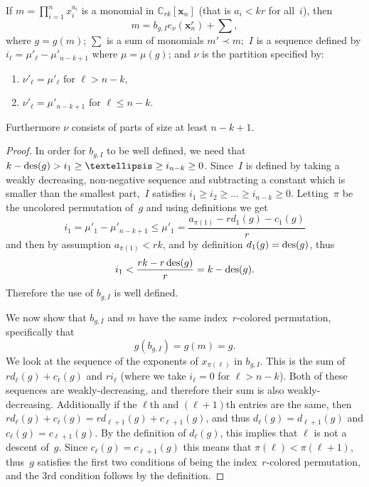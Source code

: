 \documentclass[10pt]{article}
\begin{document}
\begin{lemm}

\label{OrderLem2}
If $m=\prod_{i=1}^n x_i^{a_i}$ is a monomial in $\mathbb{C}_{rk}[\mathbf{x}_n]$ \textup{(}that is $a_i<kr$ for all~$i$\textup{)}, then
\begin{equation}
m=b_{g,I}e_\nu(\mathbf{x}_n^r)+\sum,
\end{equation}
 where $g=g(m)$; $\sum$ is a sum of 
monomials $m'\prec m$;~$I$ is a sequence defined by $i_\ell=\mu'_{\ell}-\mu'_{n-k+1}$ where $\mu=\mu(g)$; and $\nu$ is the 
partition specified by:

	\begin{enumerate}

		\item $\nu'_\ell=\mu'_\ell$ for $\ell> n-k$,

		\item $\nu'_\ell=\mu'_{n-k+1}$ for $\ell\leq n-k$.
	
	\end{enumerate}

Furthermore $\nu$ consists of parts of size at least $n-k+1$.

	\begin{proof}
	
	In order for $b_{g,I}$ to be well defined, we need that $k-\des (g)>i_1\geq \ldots\geq i_{n-k}\geq 0$. Since~$I$ is defined 
by taking a weakly decreasing, non-negative sequence and subtracting a constant which is smaller than the smallest part,~$I$ satisfies $i_1\geq i_2\geq\ldots \geq i_{n-k}\geq 0$. Letting~$\pi$ be the uncolored permutation of~$g$ and using 
definitions we get
\begin{equation}
i_1=\mu'_1-\mu'_{n-k+1}\leq \mu'_1=\frac{a_{\pi(1)}-rd_1(g)-c_1(g)}{r}
\end{equation}
and 
then by assumption $a_{\pi(1)}<rk$, and by definition $d_1(g)=\operatorname{des} (g)$, thus
\begin{equation}
i_1< 
\frac{rk-r\operatorname{des}(g)}{r}=k-\operatorname{des} (g).
\end{equation}
 Therefore the use of $b_{g,I}$ is well defined.

	
	We now show that $b_{g,I}$ and $m$ have the same index~$r$-colored permutation, specifically that 
\begin{equation}
g(b_{g,I})=g(m)=g.
\end{equation}
 We look at the sequence of the exponents of $x_{\pi(\ell)}$ in 
$b_{g,I}$. This is the sum of $rd_\ell(g)+c_\ell(g)$ and $ri_\ell$ (where we take $i_\ell=0$ for $\ell>n-k$). Both of 
these sequences are weakly-decreasing, and therefore their sum is also weakly-decreasing. Additionally if the $\ell$th and 
$(\ell+1)$th entries are the same, then $rd_\ell(g)+c_\ell(g)=rd_{\ell+1}(g)+c_{\ell+1}(g)$, and thus 
$d_\ell(g)=d_{\ell+1}(g)$ and $c_\ell(g)=c_{\ell+1}(g)$. By the definition of $d_\ell(g)$, this implies that $\ell$ is not 
a descent of~$g$. Since $c_\ell(g)=c_{\ell+1}(g)$ this means that $\pi(\ell)<\pi(\ell+1)$, thus~$g$ satisfies the first 
two conditions of being the index~$r$-colored permutation, and the 3rd condition follows by the definition.




\end{proof}
\end{lemm}
\end{document}
